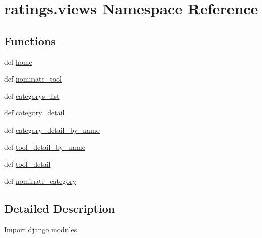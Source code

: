 \hypertarget{namespaceratings_1_1views}{\section{ratings.\-views Namespace Reference}
\label{namespaceratings_1_1views}
}
\subsection*{Functions}
\begin{DoxyCompactItemize}
\item 
def \hyperlink{namespaceratings_1_1views_a401b3d84faec578bfa116c19fa24ce67}{home}
\item 
def \hyperlink{namespaceratings_1_1views_ad512086421b30c0d5e1800034201b271}{nominate\-\_\-tool}
\item 
def \hyperlink{namespaceratings_1_1views_a7a946d0d957506dd5d6e1549d640139d}{categorys\-\_\-list}
\item 
def \hyperlink{namespaceratings_1_1views_abbd64ae210bb4d2379f8beda67368937}{category\-\_\-detail}
\item 
def \hyperlink{namespaceratings_1_1views_a9b9e82f2153c0cd0289192205cc788c6}{category\-\_\-detail\-\_\-by\-\_\-name}
\item 
def \hyperlink{namespaceratings_1_1views_a6218c4e7c538409fc2db4f4a3f67864c}{tool\-\_\-detail\-\_\-by\-\_\-name}
\item 
def \hyperlink{namespaceratings_1_1views_a8638da26f9b08f21106113d3139c8938}{tool\-\_\-detail}
\item 
def \hyperlink{namespaceratings_1_1views_a1bd9ed950e31254e7ecbfd2bdde818d7}{nominate\-\_\-category}
\end{DoxyCompactItemize}


\subsection{Detailed Description}
\begin{DoxyVerb}Import django modules
\end{DoxyVerb}
 


